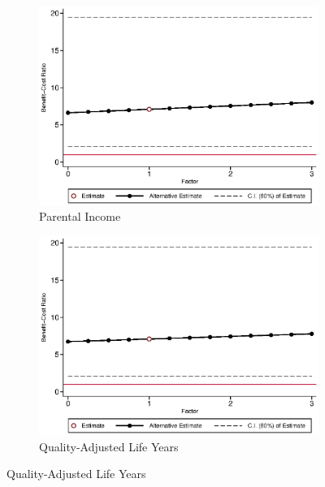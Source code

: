 \begin{figure}[H]
\ContinuedFloat		
	\begin{subfigure}[h]{0.8\textwidth}
	\centering
	\caption{Parental Income} \label{fig:bcrf_inc_parent_m1}
	\includegraphics[width=\textwidth]{AppOutput/Sensitivity/bcrf_inc_parent_m1.eps}
	\end{subfigure}
	
	\begin{subfigure}[h]{0.8\textwidth}
	\centering
	\caption{Quality-Adjusted Life Years} \label{fig:bcrf_qaly_m1}
	\includegraphics[width=\textwidth]{AppOutput/Sensitivity/bcrf_qaly_m1.eps}
	\end{subfigure}
\end{figure}


